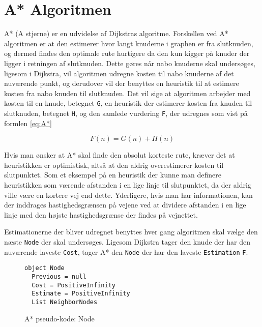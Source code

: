 \section{A* Algoritmen}\label{AStjerneTeori}
A* (A stjerne) er en udvidelse af Dijkstras algoritme. Forskellen ved A* algoritmen er at den estimerer hvor langt knuderne i graphen er fra slutknuden, og dermed findes den optimale rute hurtigere da den kun kigger på knuder der ligger i retningen af slutknuden. Dette gøres når nabo knuderne skal undersøges, ligesom i Dijkstra, vil algoritmen udregne kosten til nabo knuderne af det nuværende punkt, og derudover vil der benyttes en heuristik til at estimere kosten fra nabo knuden til slutknuden. Det vil sige at algoritmen arbejder med kosten til en knude, betegnet \texttt{G}, en heuristik der estimerer kosten fra knuden til slutknuden, betegnet \texttt{H}, og den samlede vurdering \texttt{F}, der udregnes som vist på formlen \ref{eq:A*}

\begin{equation} \label{eq:A*}
F(n) = G(n) + H(n)
\end{equation}
\vspace{5mm}

Hvis man ønsker at A* skal finde den absolut korteste rute, kræver det at heuristikken er optimistisk, altså at den aldrig overestimerer kosten til slutpunktet. Som et eksempel på en heuristik der kunne man definere heuristikken som værende afstanden i en lige linje til slutpunktet, da der aldrig ville være en kortere vej end dette. Yderligere, hvis man har informationen, kan der inddrages hastighedsgrænsen på vejene ved at dividere afstanden i en lige linje med den højste hastighedsgrænse der findes på vejnettet.

\vspace{5mm}

Estimationerne der bliver udregnet benyttes hver gang algoritmen skal vælge den næste \texttt{Node} der skal undersøges. Ligesom Dijkstra tager den knude der har den nuværende laveste \texttt{Cost}, tager A* den \texttt{Node} der har den laveste \texttt{Estimation} \texttt{F}.

\begin{figure}[H]
\begin{lstlisting}
object Node
  Previous = null
  Cost = PositiveInfinity
  Estimate = PositiveInfinity
  List NeighborNodes
\end{lstlisting}
\caption{A* pseudo-kode: Node}\label{AStarCodeNode}
\end{figure}

